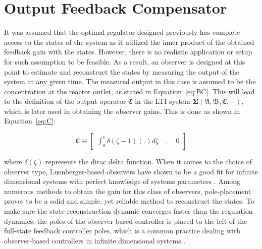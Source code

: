 \section{Output Feedback Compensator}

It was assumed that the optimal regulator designed previously has complete access to the states of the system as it utilized the inner product of the obtained feedback gain with the states. However, there is no realistic application or setup for such assumption to be feasible. As a result, an observer is designed at this point to estimate and reconstruct the states by measuring the output of the system at any given time. The measured output in this case is assumed to be the concentration at the reactor outlet, as stated in Equation~\ref{eq:BC}. This will lead to the definition of the output operator $\mathfrak{C}$ in the LTI system $\mathbf{\Sigma(\mathfrak{A},\mathfrak{B},\mathfrak{C},-)}$, which is later used in obtaining the observer gains. This is done as shown in Equation~\ref{eq:C}:

\begin{equation} \label{eq:C}
    \mathfrak{C} \equiv \begin{bmatrix}
        \int_0^1 \delta(\zeta-1) (.) d\zeta \quad , \quad 0
    \end{bmatrix}
\end{equation}

where $\delta(\zeta)$ represents the dirac delta function. When it comes to the choice of observer type, Luenberger-based observers have shown to be a good fit for infinite dimensional systems with perfect knowledge of systems parameters \autocite{ali2015reviewobserver}. Among numerous methods to obtain the gain for this class of observers, pole-placement proves to be a solid and simple, yet reliable method to reconstruct the states. To make sure the state reconstruction dynamic converges faster than the regulation dynamics, the poles of the observer-based controller is placed to the left of the full-state feedback controller poles, which is a common practice dealing with observer-based controllers in infinite dimensional systems \autocite{morrisbook}.

